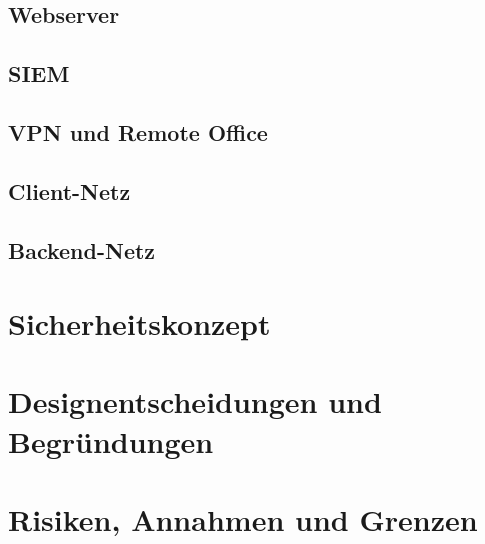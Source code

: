
\subsection{Webserver}\label{subsec:komponentenentwurf-webserver}


\subsection{SIEM}\label{subsec:komponentenentwurf-siem}


\subsection{VPN und Remote Office}\label{subsec:komponentenentwurf-vpn-und-remote-office}


\subsection{Client-Netz}\label{subsec:komponentenentwurf-client-netz}


\subsection{Backend-Netz}\label{subsec:komponentenentwurf-backend-netz}


\section{Sicherheitskonzept}\label{sec:sicherheitskonzept}


\section{Designentscheidungen und Begründungen}\label{sec:designentscheidungen-und-begruendungen}


\section{Risiken, Annahmen und Grenzen}\label{sec:risiken-annahmen-und-grenzen}

